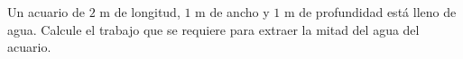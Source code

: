 \item Un acuario de $2 \text{ m}$ de longitud, $1 \text{ m}$ de ancho y $1 \text{ m}$ de profundidad está lleno de agua. Calcule el trabajo que se requiere para extraer la mitad del agua del acuario.
